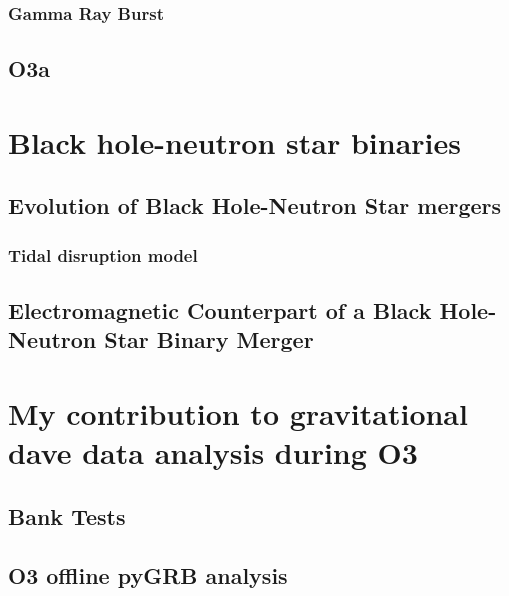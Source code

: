 \documentclass[binding=0.6cm, LaM]{sapthesis}
\begin{document}
\subsection{Gamma Ray Burst}

\section{O3a}
\chapter{Black hole-neutron star binaries}



\section{Evolution of Black Hole-Neutron Star mergers}



\subsection{Tidal disruption model}




\section{Electromagnetic Counterpart of a Black Hole-Neutron Star Binary Merger}


\chapter{My contribution to gravitational dave data analysis during O3}

\section{Bank Tests}

\section{O3 offline pyGRB analysis}
\end{document}
